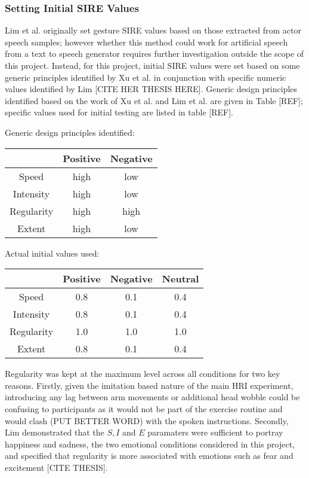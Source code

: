 \documentclass[11pt,a4paper]{report}
\begin{document}
\subsubsection{Setting Initial SIRE Values}
Lim et al. \cite{lim2011converting} originally set gesture SIRE values based on those extracted from actor speech samples; however whether this method could work for artificial speech from a text to speech generator requires further investigation outside the scope of this project. Instead, for this project, initial SIRE values were set based on some generic principles identified by Xu et al. in conjunction with specific numeric values identified by Lim [CITE HER THESIS HERE]. Generic design principles identified based on the work of Xu et al. and Lim et al. are given in Table [REF]; specific values used for initial testing are listed in table [REF]. 

Generic design principles identified:

\begin{tabular}{|c|c|c|}
\hline & Positive & Negative \\ 
\hline Speed & high & low \\ 
\hline Intensity & high & low \\ 
\hline Regularity & high & high \\ 
\hline Extent & high & low \\ 
\hline 
\end{tabular} 

Actual initial values used:

\begin{tabular}{|c|c|c|c|}
\hline & Positive & Negative & Neutral \\ 
\hline Speed & 0.8 & 0.1 & 0.4\\ 
\hline Intensity & 0.8 & 0.1 & 0.4 \\ 
\hline Regularity & 1.0 & 1.0 & 1.0 \\ 
\hline Extent & 0.8 & 0.1 & 0.4\\ 
\hline 
\end{tabular} 

Regularity was kept at the maximum level across all conditions for two key reasons. Firstly, given the imitation based nature of the main HRI experiment, introducing any lag between arm movements or additional head wobble could be confusing to participants as it would not be part of the exercise routine and would clash (PUT BETTER WORD) with the spoken instructions. Secondly, Lim demonstrated that the $S, I $ and $E$ paramaters were sufficient to portray happiness and sadness, the two emotional conditions considered in this project, and specified that regularity is more associated with emotions such as fear and excitement [CITE THESIS]. 
\end{document}
